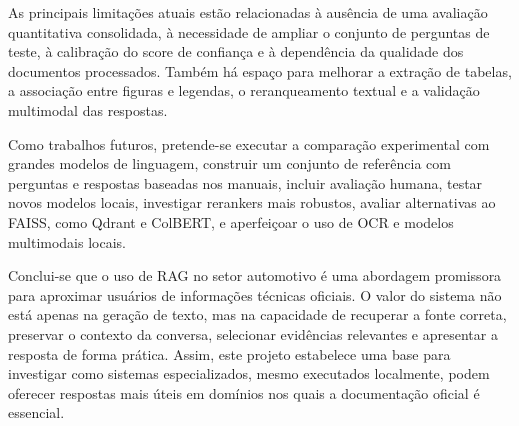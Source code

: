 As principais limitações atuais estão relacionadas à ausência de uma avaliação quantitativa consolidada, à necessidade de ampliar o conjunto de perguntas de teste, à calibração do score de confiança e à dependência da qualidade dos documentos processados. Também há espaço para melhorar a extração de tabelas, a associação entre figuras e legendas, o reranqueamento textual e a validação multimodal das respostas.

Como trabalhos futuros, pretende-se executar a comparação experimental com grandes modelos de linguagem, construir um conjunto de referência com perguntas e respostas baseadas nos manuais, incluir avaliação humana, testar novos modelos locais, investigar rerankers mais robustos, avaliar alternativas ao FAISS, como Qdrant e ColBERT, e aperfeiçoar o uso de OCR e modelos multimodais locais.

Conclui-se que o uso de RAG no setor automotivo é uma abordagem promissora para aproximar usuários de informações técnicas oficiais. O valor do sistema não está apenas na geração de texto, mas na capacidade de recuperar a fonte correta, preservar o contexto da conversa, selecionar evidências relevantes e apresentar a resposta de forma prática. Assim, este projeto estabelece uma base para investigar como sistemas especializados, mesmo executados localmente, podem oferecer respostas mais úteis em domínios nos quais a documentação oficial é essencial.
